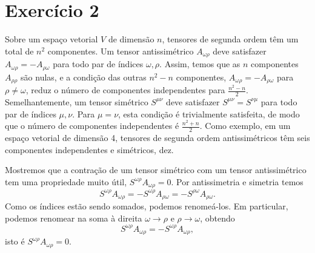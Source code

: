 \section*{Exercício 2}
Sobre um espaço vetorial \(V\) de dimensão \(n\), tensores de segunda ordem têm um total de \(n^2\) componentes. Um tensor antissimétrico \(A_{\omega\rho}\) deve satisfazer \(A_{\omega\rho} = -A_{\rho\omega}\) para todo par de índices \(\omega,\rho\). Assim, temos que as \(n\) componentes \(A_{\rho \rho}\) são nulas, e a condição das outras \(n^2 - n\) componentes, \(A_{\omega\rho} = - A_{\rho\omega}\) para \(\rho \neq \omega\), reduz o número de componentes independentes para \(\frac{n^2 - n}{2}\). Semelhantemente, um tensor simétrico \(S^{\mu\nu}\) deve satisfazer \(S^{\mu\nu} = S^{\nu\mu}\) para todo par de índices \(\mu, \nu\). Para \(\mu = \nu\), esta condição é trivialmente satisfeita, de modo que o número de componentes independentes é \(\frac{n^2 + n}{2}\). Como exemplo, em um espaço vetorial de dimensão 4, tensores de segunda ordem antissimétricos têm seis componentes independentes e simétricos, dez.

Mostremos que a contração de um tensor simétrico com um tensor antissimétrico tem uma propriedade muito útil, \(S^{\omega \rho}A_{\omega \rho} = 0\). Por antissimetria e simetria temos
\begin{equation*}
    S^{\omega\rho}A_{\omega\rho} = - S^{\omega\rho}A_{\rho \omega} = - S^{\rho\omega}A_{\rho\omega}.
\end{equation*}
Como os índices estão sendo somados, podemos renomeá-los. Em particular, podemos renomear na soma à direita \(\omega \to \rho\) e \(\rho \to \omega\), obtendo
\begin{equation*}
    S^{\omega\rho}A_{\omega\rho} = -S^{\omega\rho}A_{\omega\rho},
\end{equation*}
isto é \(S^{\omega\rho}A_{\omega\rho} = 0\).
